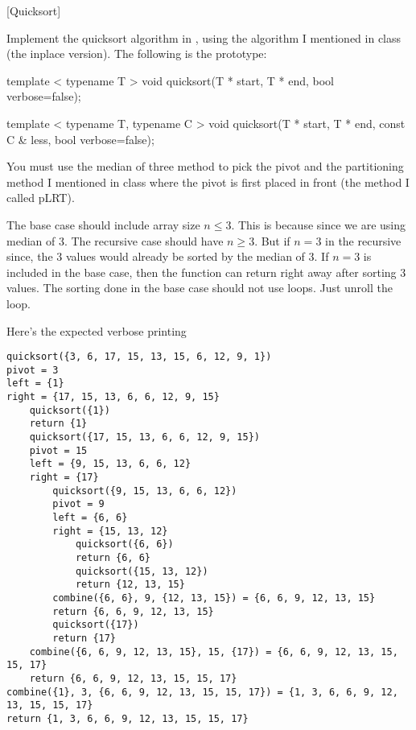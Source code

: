 [Quicksort] 

Implement the quicksort algorithm in \cpp, using the 
algorithm I mentioned in class (the inplace version).
The following is the prototype:
\begin{console}[frame=single, fontsize=\footnotesize]
template < typename T >
void quicksort(T * start, T * end, bool verbose=false);

template < typename T, typename C >
void quicksort(T * start, T * end, const C & less, bool verbose=false);
\end{console}
You must use the median of three method to pick the pivot
and the partitioning
method I mentioned in class where the pivot is first placed in front
(the method I called pLRT).

The base case should include array size $n \leq 3$.
This is because since we are using median of 3.
The recursive case should have $n \geq 3$.
But if $n = 3$ in the recursive since, the 3 values would already be
sorted by the median of 3.
If $n = 3$ is included in the base case, then the function
can return right away after sorting 3 values.
The sorting done in the base case should not use loops.
Just unroll the loop.

Here's the expected verbose printing
\begin{Verbatim}[fontsize=\footnotesize,frame=single]
quicksort({3, 6, 17, 15, 13, 15, 6, 12, 9, 1})
pivot = 3
left = {1}
right = {17, 15, 13, 6, 6, 12, 9, 15}
    quicksort({1})
    return {1}
    quicksort({17, 15, 13, 6, 6, 12, 9, 15})
    pivot = 15
    left = {9, 15, 13, 6, 6, 12}
    right = {17}
        quicksort({9, 15, 13, 6, 6, 12})
        pivot = 9
        left = {6, 6}
        right = {15, 13, 12}
            quicksort({6, 6})
            return {6, 6}
            quicksort({15, 13, 12})
            return {12, 13, 15}
        combine({6, 6}, 9, {12, 13, 15}) = {6, 6, 9, 12, 13, 15}
        return {6, 6, 9, 12, 13, 15}
        quicksort({17})
        return {17}
    combine({6, 6, 9, 12, 13, 15}, 15, {17}) = {6, 6, 9, 12, 13, 15, 15, 17}
    return {6, 6, 9, 12, 13, 15, 15, 17}
combine({1}, 3, {6, 6, 9, 12, 13, 15, 15, 17}) = {1, 3, 6, 6, 9, 12, 13, 15, 15, 17}
return {1, 3, 6, 6, 9, 12, 13, 15, 15, 17}
\end{Verbatim}
